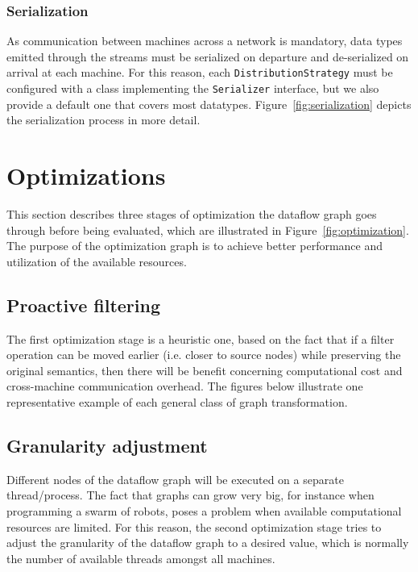 \documentclass[sigplan,screen]{acmart}
\begin{document}
\subsubsection{Serialization}
As communication between machines across a network is mandatory, data types
emitted through the streams must be serialized on departure and de-serialized on
arrival at each machine. For this reason, each \texttt{DistributionStrategy}
must be configured with a class implementing the \texttt{Serializer} interface,
but we also provide a default one that covers most datatypes.
Figure~\ref{fig:serialization} depicts the serialization process in more detail.


\section{Optimizations} \label{sec:optimization}

This section describes three stages of optimization the dataflow graph goes
through before being evaluated, which are illustrated in Figure~\ref{fig:optimization}.
The purpose of the optimization graph is to achieve better performance and
utilization of the available resources.


\subsection{Proactive filtering}

The first optimization stage is a heuristic one, based on the fact that if a
filter operation can be moved earlier (i.e. closer to source nodes) while
preserving the original semantics, then there will be benefit concerning
computational cost and cross-machine communication overhead. The figures below
illustrate one representative example of each general class of
graph transformation.


\subsection{Granularity adjustment}

Different nodes of the dataflow graph will be executed on a separate
thread/process. The fact that graphs can grow very big, for instance when
programming a swarm of robots, poses a problem when available
computational resources are limited. For this reason, the second optimization
stage tries to adjust the granularity of the dataflow graph to a desired value,
which is normally the number of available threads amongst all machines.
\end{document}
